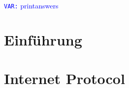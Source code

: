 \documentclass[addpoints,12pt]{exam}
\newcommand{\VAR}[1]{\textcolor{blue}{\texttt{VAR:} #1}}
\begin{document}
\VAR{printanswers}


\begin{questions}

	\section{Einführung}
	
	\clearpage

	\section{Internet Protocol}
	
	\clearpage

\end{questions}
\end{document}
